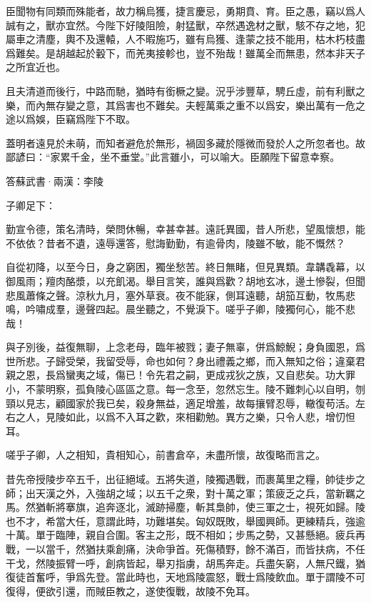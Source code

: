\documentclass[12pt,a4paper]{ctexbook}
\begin{document}
臣聞物有同類而殊能者，故力稱烏獲，捷言慶忌，勇期賁、育。臣之愚，竊以爲人誠有之，獸亦宜然。今陛下好陵阻險，射猛獸，卒然遇逸材之獸，駭不存之地，犯屬車之清塵，輿不及還轅，人不暇施巧，雖有烏獲、逢蒙之技不能用，枯木朽枝盡爲難矣。是胡越起於轂下，而羌夷接軫也，豈不殆哉！雖萬全而無患，然本非天子之所宜近也。\par
且夫清道而後行，中路而馳，猶時有銜橛之變。況乎涉豐草，騁丘虛，前有利獸之樂，而內無存變之意，其爲害也不難矣。夫輕萬乘之重不以爲安，樂出萬有一危之途以爲娛，臣竊爲陛下不取。\par
蓋明者遠見於未萌，而知者避危於無形，禍固多藏於隱微而發於人之所忽者也。故鄙諺曰：“家累千金，坐不垂堂。”此言雖小，可以喻大。臣願陛下留意幸察。\par
答蘇武書·兩漢：李陵 \par
子卿足下：\par
勤宣令德，策名清時，榮問休暢，幸甚幸甚。遠託異國，昔人所悲，望風懷想，能不依依？昔者不遺，遠辱還答，慰誨勤勤，有逾骨肉，陵雖不敏，能不慨然？\par
自從初降，以至今日，身之窮困，獨坐愁苦。終日無睹，但見異類。韋韝毳幕，以御風雨；羶肉酪漿，以充飢渴。舉目言笑，誰與爲歡？胡地玄冰，邊土慘裂，但聞悲風蕭條之聲。涼秋九月，塞外草衰。夜不能寐，側耳遠聽，胡笳互動，牧馬悲鳴，吟嘯成羣，邊聲四起。晨坐聽之，不覺淚下。嗟乎子卿，陵獨何心，能不悲哉！\par
與子別後，益復無聊，上念老母，臨年被戮；妻子無辜，併爲鯨鯢；身負國恩，爲世所悲。子歸受榮，我留受辱，命也如何？身出禮義之鄉，而入無知之俗；違棄君親之恩，長爲蠻夷之域，傷已！令先君之嗣，更成戎狄之族，又自悲矣。功大罪小，不蒙明察，孤負陵心區區之意。每一念至，忽然忘生。陵不難刺心以自明，刎頸以見志，顧國家於我已矣，殺身無益，適足增羞，故每攘臂忍辱，轍復苟活。左右之人，見陵如此，以爲不入耳之歡，來相勸勉。異方之樂，只令人悲，增忉怛耳。\par
嗟乎子卿，人之相知，貴相知心，前書倉卒，未盡所懷，故復略而言之。\par
昔先帝授陵步卒五千，出征絕域。五將失道，陵獨遇戰，而裹萬里之糧，帥徒步之師；出天漢之外，入強胡之域；以五千之衆，對十萬之軍；策疲乏之兵，當新羈之馬。然猶斬將搴旗，追奔逐北，滅跡掃塵，斬其梟帥，使三軍之士，視死如歸。陵也不才，希當大任，意謂此時，功難堪矣。匈奴既敗，舉國興師。更練精兵，強逾十萬。單于臨陣，親自合圍。客主之形，既不相如；步馬之勢，又甚懸絕。疲兵再戰，一以當千，然猶扶乘創痛，決命爭首。死傷積野，餘不滿百，而皆扶病，不任干戈，然陵振臂一呼，創病皆起，舉刃指虜，胡馬奔走。兵盡矢窮，人無尺鐵，猶復徒首奮呼，爭爲先登。當此時也，天地爲陵震怒，戰士爲陵飲血。單于謂陵不可復得，便欲引還，而賊臣教之，遂使復戰，故陵不免耳。\par
\end{document}
